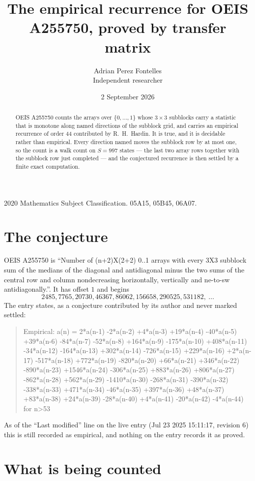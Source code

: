 \documentclass[11pt,a4paper]{article}
\title{The empirical recurrence for OEIS A255750, proved by transfer matrix}
\author{Adrian Perez Fontelles\\ \small Independent researcher}
\date{2 September 2026}
\theoremstyle{plain}
\theoremstyle{definition}
\begin{document}
\maketitle

\begin{abstract}
OEIS A255750 counts the arrays over $\{0,\dots,1\}$ whose $3\times3$ subblocks carry a
statistic that is monotone along named directions of the subblock grid, and carries an
empirical recurrence of order $44$ contributed by R.~H.~Hardin. It is true, and it is
decidable rather than empirical. Every direction named moves the subblock row by at most one,
so the count is a walk count on $S=997$ states --- the last two array rows together with the
subblock row just completed --- and the conjectured recurrence is then settled by a finite
exact computation.
\end{abstract}

\noindent\small 2020 Mathematics Subject Classification. 05A15, 05B45, 06A07.\normalsize

\section{The conjecture}

OEIS A255750 is ``Number of (n+2)X(2+2) 0..1 arrays with every 3X3 subblock sum of the medians of the diagonal and antidiagonal minus the two sums of the central row and column nondecreasing horizontally, vertically and ne-to-sw antidiagonally.''. It has offset $1$ and begins
\[
2485, 7765, 20730, 46367, 86062, 156658, 290525, 531182,\ \dots
\]
The entry states, as a conjecture contributed by its author and never marked settled:
\begin{quote}
Empirical: a(n) = 2*a(n-1) -2*a(n-2) +4*a(n-3) +19*a(n-4) -40*a(n-5) +39*a(n-6) -84*a(n-7) -52*a(n-8) +164*a(n-9) -175*a(n-10) +408*a(n-11) -34*a(n-12) -164*a(n-13) +302*a(n-14) -726*a(n-15) +229*a(n-16) +2*a(n-17) -517*a(n-18) +772*a(n-19) -820*a(n-20) +66*a(n-21) +346*a(n-22) -890*a(n-23) +1546*a(n-24) -306*a(n-25) +883*a(n-26) +806*a(n-27) -862*a(n-28) +562*a(n-29) -1410*a(n-30) -268*a(n-31) -390*a(n-32) -338*a(n-33) +471*a(n-34) -46*a(n-35) +397*a(n-36) +48*a(n-37) +83*a(n-38) +24*a(n-39) -28*a(n-40) +4*a(n-41) -20*a(n-42) -4*a(n-44) for n>53
\end{quote}
As of the ``Last modified'' line on the live entry (Jul 23 2025 15:11:17, revision 6) this is still
recorded as empirical, and nothing on the entry records it as proved.

\section{What is being counted}
\end{document}
